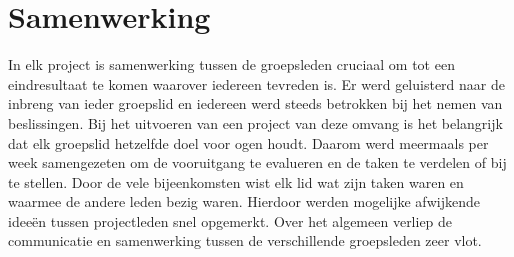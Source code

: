 
\chapter{Samenwerking}
\label{sec:samenwerking}

In elk project is samenwerking tussen de groepsleden cruciaal om tot een eindresultaat te komen waarover iedereen tevreden is. Er werd geluisterd naar de inbreng van ieder groepslid en iedereen werd steeds betrokken bij het nemen van beslissingen. Bij het uitvoeren van een project van deze omvang is het belangrijk dat elk groepslid hetzelfde doel voor ogen houdt. Daarom werd meermaals per week samengezeten om de vooruitgang te evalueren en de taken te verdelen of bij te stellen. Door de vele bijeenkomsten wist elk lid wat zijn taken waren en waarmee de andere leden bezig waren. Hierdoor werden mogelijke afwijkende ideeën tussen projectleden snel opgemerkt. Over het algemeen verliep de communicatie en samenwerking tussen de verschillende groepsleden zeer vlot.

